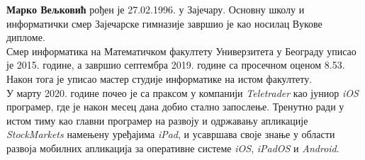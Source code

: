 \documentclass[12pt,oneside]{memoir}
\begin{document}
\indent \textbf{Марко Вељковић} рођен је 27.02.1996. у Зајечару. Основну школу и информатички смер Зајечарске гимназије завршио је као носилац Вукове дипломе.
\\
\indent Смер информатика на Математичком факултету Универзитета у Београду уписао је 2015. године, а завршио септембра 2019. године са просечном оценом 8.53. Након тога је уписао мастер студије информатике на истом факултету.
\\
\indent У марту 2020. године почео је са праксом у компанији \textit{Teletrader} као јуниор \textit{iOS} програмер, где је након месец дана добио стално запослење. Тренутно ради у истом тиму као главни програмер на развоју и одржавању апликације \textit{StockMarkets} намењену уређајима \textit{iPad}, и усавршава своје знање у области развоја мобилних апликација за оперативне системе \textit{iOS}, \textit{iPadOS} и \textit{Android}.  
\end{document}
